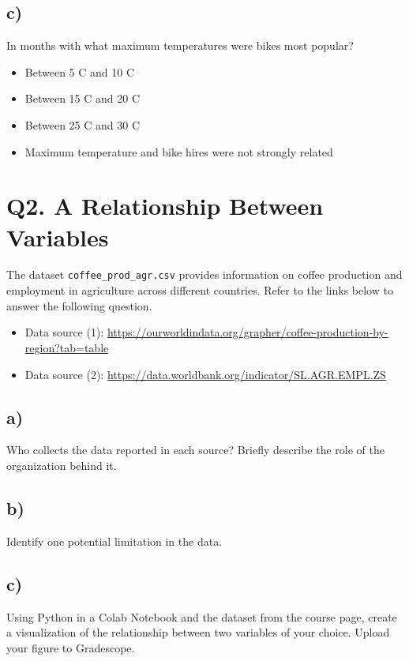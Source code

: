 \documentclass[12pt]{article}
\begin{document}
\subsection*{c)} In months with what maximum temperatures were bikes most popular?

\begin{itemize}[leftmargin=1.5cm]
    \item Between 5 C and 10 C
    \item Between 15 C and 20 C
    \item Between 25 C and 30 C
    \item Maximum temperature and bike hires were not strongly related
\end{itemize}

\section*{Q2. A Relationship Between Variables}

The dataset \texttt{coffee\_prod\_agr.csv} provides information on coffee production and employment in agriculture across different countries. Refer to the links below to answer the following question.

\begin{itemize}
    \item Data source (1): \url{https://ourworldindata.org/grapher/coffee-production-by-region?tab=table}
    \item Data source (2): \url{https://data.worldbank.org/indicator/SL.AGR.EMPL.ZS}
\end{itemize}

\subsection*{a)} Who collects the data reported in each source? Briefly describe the role of the organization behind it.

\subsection*{b)} Identify one potential limitation in the data. 

\subsection*{c)} Using Python in a Colab Notebook and the dataset from the course page, create a visualization of the relationship between two variables of your choice. Upload your figure to Gradescope.
\end{document}
